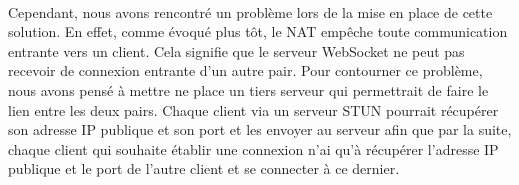 \paragraph{}
Cependant, nous avons rencontré un problème lors de la mise en place de cette solution. En effet, comme évoqué plus tôt, le NAT empêche toute communication entrante vers un client. Cela signifie que le serveur WebSocket ne peut pas recevoir de connexion entrante d'un autre pair.
Pour contourner ce problème, nous avons pensé à mettre ne place un tiers serveur qui permettrait de faire le lien entre les deux pairs. Chaque client via un serveur STUN pourrait récupérer son adresse IP publique et son port et les envoyer au serveur afin que par la suite, chaque 
client qui souhaite établir une connexion n'ai qu'à récupérer l'adresse IP publique et le port de l'autre client et se connecter à ce dernier.
